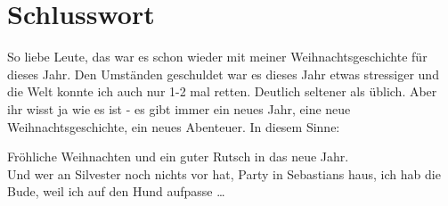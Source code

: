 \documentclass[20pt]{extarticle}
\begin{document}
\section{Schlusswort}
\label{sec:org51c64d3}
So liebe Leute, das war es schon wieder mit meiner
Weihnachtsgeschichte für dieses Jahr. Den Umständen geschuldet war
es dieses Jahr etwas stressiger und die Welt konnte ich auch nur 1-2
mal retten. Deutlich seltener als üblich. Aber ihr wisst ja wie es
ist - es gibt immer ein neues Jahr, eine neue Weihnachtsgeschichte,
ein neues Abenteuer. In diesem Sinne:

\begin{center}
Fröhliche Weihnachten und ein guter Rutsch in das neue Jahr.\\
Und wer an Silvester noch nichts vor hat, Party in Sebastians haus,
ich hab die Bude, weil ich auf den Hund aufpasse \dots{}
\end{center}
\end{document}
